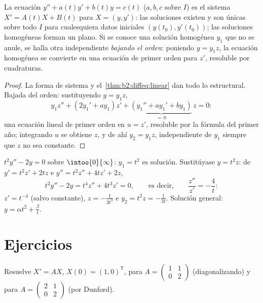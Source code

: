 \begin{proposition}\label{prop:b2:diffeq:secondorder}
La ecuación $y'' + a(t)y' + b(t)y = c(t)$ ($a, b, c$  sobre
$I$) es el sistema $X' = A(t)X + B(t)$ para $X = (y, y')$: las
soluciones existen y son únicas sobre todo $I$ para cualesquiera
datos iniciales $(y(t_0), y'(t_0))$; las soluciones homogéneas forman
un plano. Si se conoce una solución homogénea $y_1$ que no se anule,
se halla otra independiente \emph{bajando el orden}: poniendo $y = y_1
z$, la ecuación homogénea se convierte en una ecuación de primer
orden para $z'$, resoluble por cuadraturas.
\end{proposition}

\begin{proof}
La forma de sistema y el~\cref{thm:b2:diffeq:linear} dan todo lo
estructural. Bajada del orden: sustituyendo $y = y_1z$,
\[
y_1 z'' + (2y_1' + a y_1)z' + \underbrace{(y_1'' + ay_1' +
by_1)}_{=\,0}\,z = 0 :
\]
una ecuación lineal de primer orden en $u = z'$, resoluble por la
fórmula del primer año; integrando $u$ se obtiene $z$, y de ahí $y_2 =
y_1 z$, independiente de $y_1$ siempre que $z$ no sea constante.
\end{proof}

\begin{example}\label{ex:b2:diffeq:lowering}
$t^2y'' - 2y = 0$ sobre $\intoo{0}{\infty}$: $y_1 = t^2$ es solución.
Sustitúyase $y = t^2z$: de $y' = t^2z' + 2tz$ e $y'' = t^2z'' + 4tz' +
2z$,
\[
t^2y'' - 2y = t^4 z'' + 4t^3z' = 0,
\qquad\text{es decir,}\qquad \frac{z''}{z'} = -\frac4t :
\]
$z' = t^{-4}$ (salvo constante), $z = -\frac{1}{3t^3}$ e $y_2 = t^2z
= -\frac{1}{3t}$. Solución general: $y = \alpha t^2 +
\frac{\beta}{t}$.
\end{example}

\section{Ejercicios}

\begin{exercise}[$\star$]\label{exo:b2:diffeq:1}
Resuelve $X' = AX$, $X(0) = (1, 0)^{\mathsf T}$, para $A =
\begin{pmatrix} 1 & 1\\ 0 & 2\end{pmatrix}$ (diagonalizando) y para
$A = \begin{pmatrix} 2 & 1\\ 0 & 2 \end{pmatrix}$ (por Dunford).
\end{exercise}

